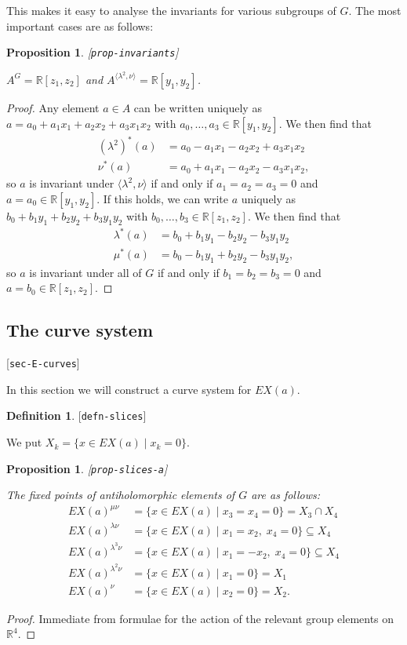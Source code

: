 \documentclass[reqno]{amsart}
\newcommand{\lbl}[1]{\label{#1}\textup{[\texttt{#1}]}\par}
\newcommand{\lbl}{\label}
\newcommand{\lm}        {\lambda}
\newcommand{\R}         {{\mathbb{R}}}
\newcommand{\ip}[1]     {\langle #1\rangle}
\newcommand{\st}        {\;|\;}
\newcommand{\sse}       {\subseteq}
\renewcommand{\:}{\colon}
\newtheorem{proposition}[theorem]{Proposition}
\theoremstyle{definition}
\newtheorem{definition}[theorem]{Definition}
\begin{document}
This makes it easy to analyse the invariants for various subgroups of
$G$.  The most important cases are as follows:
\begin{proposition}\lbl{prop-invariants}
 $A^G=\R[z_1,z_2]$ and $A^{\ip{\lm^2,\nu}}=\R[y_1,y_2]$.
\end{proposition}
\begin{proof}
 Any element $a\in A$ can be written uniquely as
 $a=a_0+a_1x_1+a_2x_2+a_3x_1x_2$ with $a_0,\dotsc,a_3\in\R[y_1,y_2]$.
 We then find that
 \begin{align*}
  (\lm^2)^*(a) &= a_0 - a_1x_1 - a_2x_2 + a_3x_1x_2 \\
  \nu^*(a)     &= a_0 + a_1x_1 - a_2x_2 - a_3x_1x_2,
 \end{align*}
 so $a$ is invariant under $\ip{\lm^2,\nu}$ if and only if
 $a_1=a_2=a_3=0$ and $a=a_0\in\R[y_1,y_2]$.  If this holds, we can
 write $a$ uniquely as $b_0+b_1y_1+b_2y_2+b_3y_1y_2$ with
 $b_0,\dotsc,b_3\in\R[z_1,z_2]$.  We then find that
 \begin{align*}
  \lm^*(a) &= b_0 + b_1y_1 - b_2y_2 - b_3y_1y_2 \\
  \mu^*(a) &= b_0 - b_1y_1 + b_2y_2 - b_3y_1y_2,
 \end{align*}
 so $a$ is invariant under all of $G$ if and only if $b_1=b_2=b_3=0$
 and $a=b_0\in\R[z_1,z_2]$.
\end{proof}

\subsection{The curve system}
\lbl{sec-E-curves}

In this section we will construct a curve system for $EX(a)$.

\begin{definition}\lbl{defn-slices}
 We put $X_k=\{x\in EX(a)\st x_k=0\}$.
\end{definition}

\begin{proposition}\lbl{prop-slices-a}
 The fixed points of antiholomorphic elements of $G$ are as follows:
 \begin{align*}
  EX(a)^{\mu\nu}   &= \{x\in EX(a)\st x_3=x_4=0\} = X_3\cap X_4 \\
  EX(a)^{\lm\nu}   &= \{x\in EX(a)\st x_1=x_2,\;x_4=0\} \sse X_4 \\
  EX(a)^{\lm^3\nu} &= \{x\in EX(a)\st x_1=-x_2,\;x_4=0\} \sse X_4 \\
  EX(a)^{\lm^2\nu} &= \{x\in EX(a)\st x_1=0\} = X_1 \\
  EX(a)^\nu        &= \{x\in EX(a)\st x_2=0\} = X_2.
 \end{align*}
\end{proposition}
\begin{proof}
 Immediate from formulae for the action of the relevant group elements
 on $\R^4$.
\end{proof}
\end{document}
